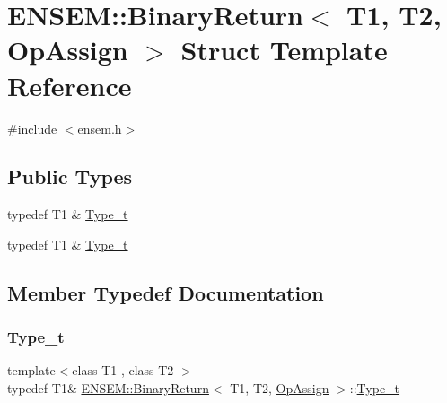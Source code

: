 \hypertarget{structENSEM_1_1BinaryReturn_3_01T1_00_01T2_00_01OpAssign_01_4}{}\section{E\+N\+S\+EM\+:\+:Binary\+Return$<$ T1, T2, Op\+Assign $>$ Struct Template Reference}
\label{structENSEM_1_1BinaryReturn_3_01T1_00_01T2_00_01OpAssign_01_4}


{\ttfamily \#include $<$ensem.\+h$>$}

\subsection*{Public Types}
\begin{DoxyCompactItemize}
\item 
typedef T1 \& \mbox{\hyperlink{structENSEM_1_1BinaryReturn_3_01T1_00_01T2_00_01OpAssign_01_4_a190b733bfdae86d7ca324cd9290b4100}{Type\+\_\+t}}
\item 
typedef T1 \& \mbox{\hyperlink{structENSEM_1_1BinaryReturn_3_01T1_00_01T2_00_01OpAssign_01_4_a190b733bfdae86d7ca324cd9290b4100}{Type\+\_\+t}}
\end{DoxyCompactItemize}


\subsection{Member Typedef Documentation}
\mbox{\label{structENSEM_1_1BinaryReturn_3_01T1_00_01T2_00_01OpAssign_01_4_a190b733bfdae86d7ca324cd9290b4100}} 
\subsubsection{\texorpdfstring{Type\_t}{Type\_t}\hspace{0.1cm}{\footnotesize\ttfamily [1/2]}}
{\footnotesize\ttfamily template$<$class T1 , class T2 $>$ \\
typedef T1\& \mbox{\hyperlink{structENSEM_1_1BinaryReturn}{E\+N\+S\+E\+M\+::\+Binary\+Return}}$<$ T1, T2, \mbox{\hyperlink{structENSEM_1_1OpAssign}{Op\+Assign}} $>$\+::\mbox{\hyperlink{structENSEM_1_1BinaryReturn_3_01T1_00_01T2_00_01OpAssign_01_4_a190b733bfdae86d7ca324cd9290b4100}{Type\+\_\+t}}}

